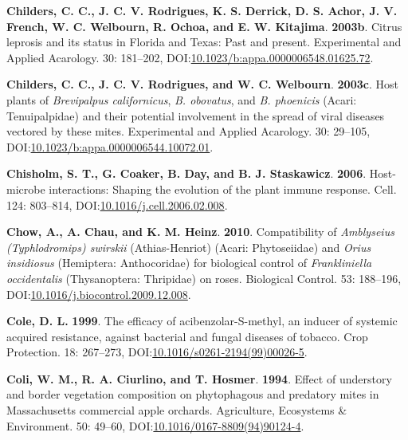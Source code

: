 \documentclass[12pt,final,CPage]{ufthesis}
\newlength{\cslhangindent}
\newenvironment{CSLReferences}[2] %
{%
	\setlength{\parindent}{0pt}
	\ifodd #1 \everypar{\setlength{\hangindent}{\cslhangindent}}\ignorespaces\fi
	\ifnum #2 > 0
	\setlength{\parskip}{#2\baselineskip}
	\fi
}%
{}
\begin{document}
{\begin{CSLReferences}{1}{0}
  \leavevmode{}%
  \textbf{Childers, C. C., J. C. V. Rodrigues, K. S. Derrick, D. S. Achor, J. V. French, W. C. Welbourn, R. Ochoa, and E. W. Kitajima}. \textbf{2003b}. {Citrus leprosis} and its status in {Florida} and {Texas}: Past and present. Experimental and Applied Acarology. 30: 181--202, DOI:\href{https://doi.org/10.1023/b:appa.0000006548.01625.72}{10.1023/b:appa.0000006548.01625.72}.

  \leavevmode{}%
  \textbf{Childers, C. C., J. C. V. Rodrigues, and W. C. Welbourn}. \textbf{2003c}. Host plants of {\emph{Brevipalpus californicus}}, {\emph{B. obovatus}}, and {\emph{B. phoenicis}} ({Acari}: {Tenuipalpidae}) and their potential involvement in the spread of viral diseases vectored by these mites. Experimental and Applied Acarology. 30: 29--105, DOI:\href{https://doi.org/10.1023/b:appa.0000006544.10072.01}{10.1023/b:appa.0000006544.10072.01}.

  \leavevmode{}%
  \textbf{Chisholm, S. T., G. Coaker, B. Day, and B. J. Staskawicz}. \textbf{2006}. Host-microbe interactions: Shaping the evolution of the plant immune response. Cell. 124: 803--814, DOI:\href{https://doi.org/10.1016/j.cell.2006.02.008}{10.1016/j.cell.2006.02.008}.

  \leavevmode{}%
  \textbf{Chow, A., A. Chau, and K. M. Heinz}. \textbf{2010}. Compatibility of {\emph{Amblyseius (Typhlodromips) swirskii}} ({Athias-Henriot}) ({Acari: Phytoseiidae}) and {\emph{Orius insidiosus}} ({Hemiptera}: {Anthocoridae}) for biological control of {\emph{Frankliniella occidentalis}} ({Thysanoptera:} {Thripidae}) on roses. Biological Control. 53: 188--196, DOI:\href{https://doi.org/10.1016/j.biocontrol.2009.12.008}{10.1016/j.biocontrol.2009.12.008}.

  \leavevmode{}%
  \textbf{Cole, D. L.} \textbf{1999}. The efficacy of acibenzolar-{S}-methyl, an inducer of systemic acquired resistance, against bacterial and fungal diseases of tobacco. Crop Protection. 18: 267--273, DOI:\href{https://doi.org/10.1016/s0261-2194(99)00026-5}{10.1016/s0261-2194(99)00026-5}.

  \leavevmode{}%
  \textbf{Coli, W. M., R. A. Ciurlino, and T. Hosmer}. \textbf{1994}. Effect of understory and border vegetation composition on phytophagous and predatory mites in {Massachusetts} commercial apple orchards. Agriculture, Ecosystems {\&} Environment. 50: 49--60, DOI:\href{https://doi.org/10.1016/0167-8809(94)90124-4}{10.1016/0167-8809(94)90124-4}.


\end{CSLReferences}}
\end{document}
